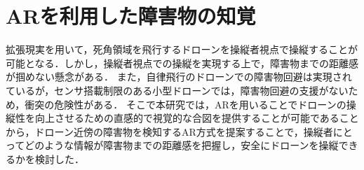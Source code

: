 \documentclass[a4j,10pt,twocolumn]{jarticle}
\begin{document}
\section{ARを利用した障害物の知覚}
拡張現実を用いて，死角領域を飛行するドローンを操縦者視点で操縦することが可能となる．しかし，操縦者視点での操縦を実現する上で，障害物までの距離感が掴めない懸念がある．
また，自律飛行のドローンでの障害物回避は実現されているが，センサ搭載制限のある小型ドローンでは，障害物回避の支援がないため，衝突の危険性がある．
そこで本研究では，ARを用いることでドローンの操縦性を向上させるための直感的で視覚的な合図を提供することが可能である\cite{ARinterface}ことから，ドローン近傍の障害物を検知するAR方式を提案することで，操縦者にとってどのような情報が障害物までの距離感を把握し，安全にドローンを操縦できるかを検討した．
\end{document}
